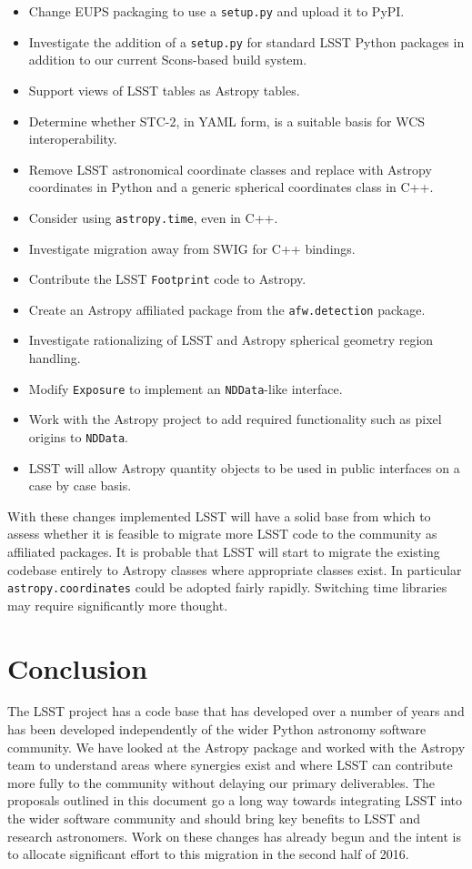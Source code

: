\documentclass[]{spie}  %
\begin{document}
\begin{itemize}
\item Change EUPS packaging to use a \texttt{setup.py} and upload it to PyPI.
\item Investigate the addition of a \texttt{setup.py} for standard LSST Python packages in addition to our current Scons-based build system.
\item Support views of LSST tables as Astropy tables.
\item Determine whether STC-2, in YAML form, is a suitable basis for WCS interoperability.
\item Remove LSST astronomical coordinate classes and replace with Astropy coordinates in Python and a generic spherical coordinates class in C++.
\item Consider using \texttt{astropy.time}, even in C++.
\item Investigate migration away from SWIG for C++ bindings.
\item Contribute the LSST \texttt{Footprint} code to Astropy.
\item Create an Astropy affiliated package from the \texttt{afw.detection} package.
\item Investigate rationalizing of LSST and Astropy spherical geometry region handling.
\item Modify \texttt{Exposure} to implement an \texttt{NDData}-like interface.
\item Work with the Astropy project to add required functionality such as pixel origins to \texttt{NDData}.
\item LSST will allow Astropy quantity objects to be used in public interfaces on a case by case basis.

\end{itemize}

With these changes implemented LSST will have a solid base from which to assess whether it is feasible to migrate more LSST code to the community as affiliated packages.
It is probable that LSST will start to migrate the existing codebase entirely to Astropy classes where appropriate classes exist.
In particular \texttt{astropy.coordinates} could be adopted fairly rapidly.
Switching time libraries may require significantly more thought.

\section{Conclusion}

The LSST project has a code base that has developed over a number of years and has been developed independently of the wider Python astronomy software community.
We have looked at the Astropy package and worked with the Astropy team to understand areas where synergies exist and where LSST can contribute more fully to the community without delaying our primary deliverables.
The proposals outlined in this document go a long way towards integrating LSST into the wider software community and should bring key benefits to LSST and research astronomers.
Work on these changes has already begun and the intent is to allocate significant effort to this migration in the second half of 2016.
\end{document}
